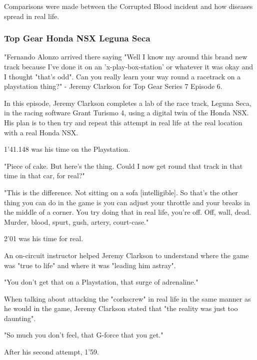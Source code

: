\documentclass{article}
\begin{document}

Comparisons were made between the Corrupted Blood incident and how diseases spread in real life.

\subsubsection{Top Gear Honda NSX Leguna Seca}

"Fernando Alonzo arrived there saying "Well I know my around this brand new track because I've done it on an 'x-play-box-station' or whatever it was okay and I thought "that's odd". Can you really learn your way round a racetrack on a playstation thing?" - Jeremy Clarkson for Top Gear Series 7 Episode 6.

In this episode, Jeremy Clarkson completes a lab of the race track, Leguna Seca, in the racing software Grant Turismo 4, using a digital twin of the Honda NSX. His plan is to then try and repeat this attempt in real life at the real location with a real Honda NSX.


1'41.148 was his time on the Playstation.

"Piece of cake. But here's the thing. Could I now get round that track in that time in that car, for real?"

"This is the difference. Not sitting on a sofa [intelligible]. So that's the other thing you can do in the game is you can adjust your throttle and your breaks in the middle of a corner. You try doing that in real life, you're off. Off, wall, dead. Murder, blood, spurt, gush, artery, court-case."

2'01 was his time for real. 

An on-circuit instructor helped Jeremy Clarkson to understand where the game was "true to life" and where it was "leading him astray".

"You don't get that on a Playstation, that surge of adrenaline." 

When talking about attacking the "corkscrew" in real life in the same manner as he would in the game, Jeremy Clarkson stated that "the reality was just too daunting". 

"So much you don't feel, that G-force that you get."

After his second attempt, 1'59. 
\end{document}

